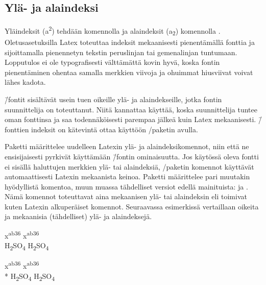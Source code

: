 \subsection{Ylä- ja alaindeksi}

Yläindeksit (a\textsuperscript{2}) tehdään komennolla  ja alaindeksit (a\textsubscript{2}) komennolla
. Oletusasetuksilla Latex toteuttaa
indeksit mekaanisesti pienentämällä fonttia ja sijoittamalla pienennetyn
tekstin peruslinjan tai gemenalinjan tuntumaan. Lopputulos ei ole
typografisesti välttämättä kovin hyvä, koska fontin pienentäminen
ohentaa samalla merkkien viivoja ja ohuimmat hiusviivat voivat lähes
kadota.

 \=/fontit sisältävät usein tuen oikeille ylä- ja
alaindekseille, jotka fontin suunnittelija on toteuttanut. Niitä
kannattaa käyttää, koska suunnittelija tuntee oman fonttinsa ja saa
todennäköisesti parempaa jälkeä kuin Latex mekaanisesti.  \=/fonttien indeksit on kätevintä ottaa käyttöön
\-/paketin avulla.

Paketti  määrittelee uudelleen Latexin ylä- ja
alaindeksikomennot, niin että ne ensisijaisesti pyrkivät käyttämään
 \=/fontin ominaisuutta. Jos käytössä oleva fontti
ei sisällä haluttujen merkkien ylä- tai alaindeksiä,
\-/paketin komennot käyttävät automaattisesti
Latexin mekaanista keinoa. Paketti määrittelee pari muutakin hyödyllistä
komentoa, muun muassa tähdelliset versiot edellä mainituista:
 ja . Nämä komennot toteuttavat aina mekaanisen ylä-
tai alaindeksin eli toimivat kuten Latexin alkuperäiset komennot.
Seuraavassa esimerkissä vertaillaan oikeita ja mekaanisia (tähdelliset)
ylä- ja alaindeksejä.


\begin{koodilohkosis}
  x\textsuperscript {ab36}
  x\textsuperscript*{ab36} \\
  H\textsubscript {2}SO\textsubscript {4}
  H\textsubscript*{2}SO\textsubscript*{4}
\end{koodilohkosis}

\begin{tulossis}
  x\textsuperscript {ab36}
  x\textsuperscript*{ab36} \\*
  H\textsubscript {2}SO\textsubscript {4}
  H\textsubscript*{2}SO\textsubscript*{4}
\end{tulossis}

